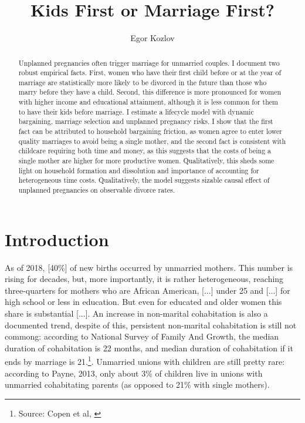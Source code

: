 \documentclass[12pt,letter]{article}
\title{Kids First or Marriage First?}
\author{Egor Kozlov}
\begin{document}
\maketitle



\begin{abstract}
Unplanned pregnancies often trigger marriage for unmarried couples. I document two robust empirical facts. First, women who have their first child before or at the year of marriage are statistically more likely to be divorced in the future than those who marry before they have a child. Second, this difference is more pronounced for women with higher income and educational attainment, although it is less common for them to have their kids before marriage. I estimate a lifecycle model with dynamic bargaining, marriage selection and unplanned pregnancy risks. I show that the first fact can be attributed to household bargaining friction, as women agree to enter lower quality marriages to avoid being a single mother, and  the second fact is consistent with childcare requiring both time and money, as this suggests that the costs of being a single mother are higher for more productive women. Qualitatively, this sheds some light on household formation and dissolution and importance of accounting for heterogeneous time costs. Qualitatively, the model suggests sizable causal effect of unplanned pregnancies on observable divorce rates.
\end{abstract}

\section{Introduction}
As of 2018, [40\%] of new births occurred by unmarried mothers. This number is rising for decades, but, more importantly, it is rather heterogeneous, reaching three-quarters for mothers who are African American, [...] under 25 and [...] for high school or less in education. But even for educated and older women this share is substantial [...]. An increase in non-marital cohabitation is also a documented trend, despite of this, persistent non-marital cohabitation is still not commong: according to National Survey of Family And Growth, the median duration of cohabitation is 22 months, and median duration of cohabitation if it ends by marriage is 21.\footnote{Source: Copen et al, \cite{copen}}. Unmarried unions with children are still pretty rare: according to Payne, 2013\nocite{payne}, only about 3\% of children live in unions with unmarried cohabitating parents (as opposed to 21\% with single mothers). 
\end{document}
